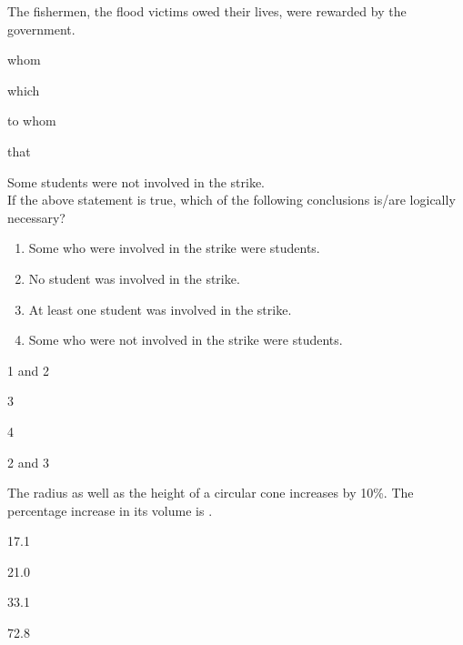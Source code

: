 \iffalse
    \title{Assignment}
    \author{EE24BTECH11063}
    \section{ma}
    \chapter{2019}
  \fi
\item The fishermen, \underline{\hspace{2cm}} the flood victims owed their lives, were rewarded by the government.\\
\begin{enumerate}
\begin{multicols}{4}
    \item whom
    \item which
    \item to whom
    \item that
    \end{multicols}
\end{enumerate}

\bigskip

\item Some students were not involved in the strike.\\
If the above statement is true, which of the following conclusions is/are logically necessary?\\
\begin{enumerate}
    \item[(1.)] Some who were involved in the strike were students.
    \item[(2.)] No student was involved in the strike.
    \item[(3.)]  At least one student was involved in the strike.
    \item[(4.)] Some who were not involved in the strike were students.
\end{enumerate}
\begin{enumerate}
\begin{multicols}{4}
    \item 1 and 2
    \item 3
    \item 4
    \item 2 and 3
    \end{multicols}
\end{enumerate}

\bigskip

\item The radius as well as the height of a circular cone increases by 10\%. The percentage increase in its volume is \underline{\hspace{2cm}}.\\
\begin{enumerate}
\begin{multicols}{4}
    \item 17.1
    \item 21.0
    \item 33.1
    \item 72.8
    \end{multicols}
\end{enumerate}

